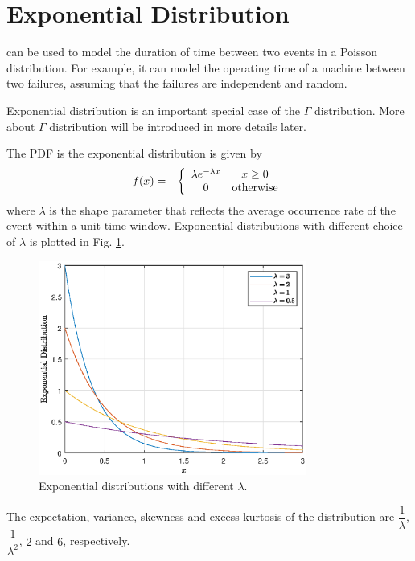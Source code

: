 \section{Exponential Distribution} \label{sec:exponential_distribution}

 can be used to model the duration of time between two events in a Poisson distribution. For example, it can model the operating time of a machine between two failures, assuming that the failures are independent and random.

Exponential distribution is an important special case of the $\Gamma$ distribution. More about $\Gamma$ distribution will be introduced in more details later.

The PDF is the exponential distribution is given by
\begin{eqnarray}
	f(x) &=& \left\{\begin{array}{cc}
		\lambda e^{-\lambda x} & x \geq 0 \\
		0 & \textup{otherwise}
	\end{array}\right. \label{eq:exponential_pdf}
\end{eqnarray}
where $\lambda$ is the shape parameter that reflects the average occurrence rate of the event within a unit time window. Exponential distributions with different choice of $\lambda$ is plotted in Fig. \ref{fig:exponential}.
\begin{figure}[!htb]
	\centering
	\includegraphics[width=250pt]{chapters/part-1/figures/exponential_pdf.eps}
	\caption{Exponential distributions with different $\lambda$.} \label{fig:exponential}
\end{figure}

The expectation, variance, skewness and excess kurtosis of the distribution are $\dfrac{1}{\lambda}$, $\dfrac{1}{\lambda^2}$, $2$ and $6$, respectively.

